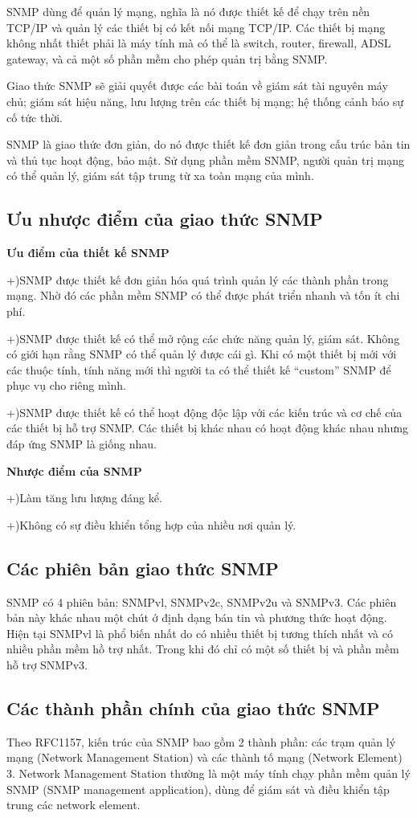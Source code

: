 \documentclass[12pt,oneside,a4paper,reqno]{report}
\begin{document}
\begin{large}
SNMP dùng để quản lý mạng, nghĩa là nó được thiết kế để chạy trên nền TCP/IP và quản lý các thiết bị có kết nối mạng TCP/IP. Các thiết bị mạng không nhất thiết phải là máy tính mà có thể là switch, router, firewall, ADSL gateway, và cả một số phần mềm cho phép quản trị bằng SNMP.

Giao thức SNMP sẽ giải quyết được các bài toán về giám sát tài nguyên máy chủ; giám sát hiệu năng, lưu lượng trên các thiết bị mạng; hệ thống cảnh báo sự cố tức thời.

SNMP là giao thức đơn giản, do nó được thiết kế đơn giản trong cấu trúc bản tin và thủ tục hoạt động, bảo mật. Sử dụng phần mềm SNMP, người quản trị mạng có thể quản lý, giám sát tập trung từ xa toàn mạng của mình.
\subsection{Ưu nhược điểm của giao thức SNMP}

\textbf{Ưu điểm của thiết kế SNMP}

+)SNMP được thiết kế đơn giản hóa quá trình quản lý các thành phần trong mạng. Nhờ đó các phần mềm SNMP có thể được phát triển nhanh và tốn ít chi phí.

+)SNMP được thiết kế có thể mở rộng các chức năng quản lý, giám sát. Không có giới hạn rằng SNMP có thể quản lý được cái gì. Khi có một thiết bị mới với các thuộc tính, tính năng mới thì người ta có thể thiết kế “custom” SNMP để phục vụ cho riêng mình.

+)SNMP được thiết kế có thể hoạt động độc lập với các kiến trúc và cơ chế của các thiết bị hỗ trợ SNMP. Các thiết bị khác nhau có hoạt động khác nhau nhưng đáp ứng SNMP là giống nhau.

\textbf{Nhược điểm của SNMP}

+)Làm tăng lưu lượng đáng kể.

+)Không có sự điều khiển tổng hợp của nhiều nơi quản lý.
\subsection{Các phiên bản giao thức SNMP}
SNMP có 4 phiên bản: SNMPvl, SNMPv2c, SNMPv2u và SNMPv3. Các phiên bản này khác nhau một chút ớ định dạng bán tin và phương thức hoạt động. Hiện tại SNMPvl là phổ biến nhất do có nhiều thiết bị tương thích nhất và có nhiều phần mềm hồ trợ nhất. Trong khi đó chỉ có một số thiết bị và phần mềm hỗ trợ SNMPv3. 
\subsection{Các thành phần chính của giao thức SNMP}
Theo RFC1157, kiến trúc của SNMP bao gồm 2 thành phần: các trạm quản lý mạng (Network Management Station) và các thành tố mạng (Network Element) 3. Network Management Station thường là một máy tính chạy phần mềm quản lý SNMP (SNMP management application), dùng để giám sát và điều khiển tập trung các network element.

\end{large}
\end{document}
